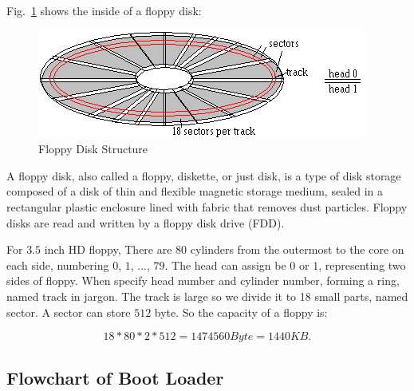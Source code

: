 \documentclass{swfcthesisp}
\begin{document}
Fig.~\ref{fig:flpy1.png} shows the inside of a floppy disk:
\begin{figure}[!ht]
  \centering
  \includegraphics[width=.5\textwidth]{../figs/bootLoader/flpy1.png}
  \caption{Floppy Disk Structure}
  \label{fig:flpy1.png}
\end{figure}

\par
A floppy disk, also called a floppy, diskette, or just disk, is a type of disk storage
composed of a disk of thin and flexible magnetic storage medium, sealed in a rectangular
plastic enclosure lined with fabric that removes dust particles. Floppy disks are read and
written by a floppy disk drive (FDD).

\par
For $3.5$ inch HD floppy,  There are $80$ cylinders from the outermost to
the core on each side, numbering $0$, $1$, ..., $79$. The head can assign be $0$ or $1$,
representing two sides of floppy. When specify head number and cylinder number, forming a
ring, named track in jargon. The track is large so we divide it to 18 small parts, named
sector. A sector can store $512$ byte. So the capacity of a floppy is:

$$18 * 80 * 2 * 512 = 1474560 Byte = 1440 KB.$$



\subsection{Flowchart of Boot Loader}
\label{sec:flowch-boot-load}
\end{document}
